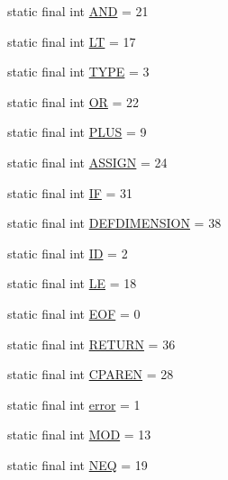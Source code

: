 \begin{DoxyCompactItemize}
\item 
static final int \hyperlink{interfacecas_1_1parser_1_1_mata_sym_a94c3287d5716ffee12c90e5a87d18463}{A\-N\-D} = 21
\item 
static final int \hyperlink{interfacecas_1_1parser_1_1_mata_sym_a641aea735f248c2586c2847e6e6617fa}{L\-T} = 17
\item 
static final int \hyperlink{interfacecas_1_1parser_1_1_mata_sym_a06577560a87146085a83831e11d726e2}{T\-Y\-P\-E} = 3
\item 
static final int \hyperlink{interfacecas_1_1parser_1_1_mata_sym_ab9fe9b33ffef36a9ad886b44194f2c8c}{O\-R} = 22
\item 
static final int \hyperlink{interfacecas_1_1parser_1_1_mata_sym_adcaea7cc4944831a7a4839ddf764eab1}{P\-L\-U\-S} = 9
\item 
static final int \hyperlink{interfacecas_1_1parser_1_1_mata_sym_aaea76e17e868277c4f0e58481cd59474}{A\-S\-S\-I\-G\-N} = 24
\item 
static final int \hyperlink{interfacecas_1_1parser_1_1_mata_sym_a84c0a77781255dd25ecdb6d043c16aed}{I\-F} = 31
\item 
static final int \hyperlink{interfacecas_1_1parser_1_1_mata_sym_a68d9de111b16e2802c552e0099b59999}{D\-E\-F\-D\-I\-M\-E\-N\-S\-I\-O\-N} = 38
\item 
static final int \hyperlink{interfacecas_1_1parser_1_1_mata_sym_ae93355ce8238c62171aa9c2aa2d4452c}{I\-D} = 2
\item 
static final int \hyperlink{interfacecas_1_1parser_1_1_mata_sym_a136a25071bc812d272d81a52d10c3cb7}{L\-E} = 18
\item 
static final int \hyperlink{interfacecas_1_1parser_1_1_mata_sym_a87a9615810ea9e64927b109d71de62fd}{E\-O\-F} = 0
\item 
static final int \hyperlink{interfacecas_1_1parser_1_1_mata_sym_a5193398b28e1df4288d7e5f940fdd9f5}{R\-E\-T\-U\-R\-N} = 36
\item 
static final int \hyperlink{interfacecas_1_1parser_1_1_mata_sym_a81b06725d181e73925ed3a4d124adce4}{C\-P\-A\-R\-E\-N} = 28
\item 
static final int \hyperlink{interfacecas_1_1parser_1_1_mata_sym_a2fcf36fa542db91ba074a7cad31544d0}{error} = 1
\item 
static final int \hyperlink{interfacecas_1_1parser_1_1_mata_sym_a0c2c1c409279f4d616797a2b9e785e00}{M\-O\-D} = 13
\item 
static final int \hyperlink{interfacecas_1_1parser_1_1_mata_sym_aeb711fc8fb9aee152d98908b8dd7b778}{N\-E\-Q} = 19
\item 

\end{DoxyCompactItemize}
